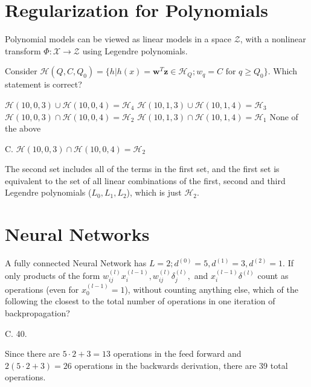 \documentclass[answers]{exam}
\begin{document}
\section*{Regularization for Polynomials}

Polynomial models can be viewed as linear models in a space $\mathcal{Z}$, 
with a nonlinear transform $\Phi : \mathcal{X} \to \mathcal{Z}$ using 
Legendre polynomials.

\begin{questions}
\setcounter{question}{6}
\question Consider $\mathcal{H}(Q, C, Q_0) = \{h | h(x) = \textbf{w}^T\textbf{z} 
\in \mathcal{H}_Q; w_q = C \text{ for } q \geq Q_0\}$. Which statement is correct?
\begin{choices}
\choice $\mathcal{H}(10, 0, 3) \cup \mathcal{H}(10, 0, 4) = \mathcal{H}_4$
\choice $\mathcal{H}(10, 1, 3) \cup \mathcal{H}(10, 1, 4) = \mathcal{H}_3$
\choice $\mathcal{H}(10, 0, 3) \cap \mathcal{H}(10, 0, 4) = \mathcal{H}_2$
\choice $\mathcal{H}(10, 1, 3) \cap \mathcal{H}(10, 1, 4) = \mathcal{H}_1$
\choice None of the above
\end{choices}

\begin{solution}
C. $\mathcal{H}(10, 0, 3) \cap \mathcal{H}(10, 0, 4) = \mathcal{H}_2$

The second set includes all of the terms in the first set, and the first
set is equivalent to the set of all linear combinations of the first, second
and third Legendre polynomials ($L_0, L_1, L_2$), which is just $\mathcal{H}_{2}$.
\end{solution}
\end{questions}

\section*{Neural Networks}

\begin{questions}
\setcounter{question}{7}
\question A fully connected Neural Network has $L = 2; d^{(0)} = 5, d^{(1)}
= 3, d^{(2)} = 1$. If only products of the form $w_{ij}^{(l)}x_{i}^{(l-1)}, 
w_{ij}^{(l)}\delta_{j}^{(l)},$ and $x_{i}^{(l-1)}\delta^{(l)}$ count as 
operations (even for $x_0^{(l-1)} = 1$), without counting anything else, 
which of the following the closest to the total number of operations in 
one iteration of backpropagation?
\begin{choices}
\end{choices}

\begin{solution}
C. 40.

Since there are $5 \cdot 2 + 3 = 13$ operations in the feed forward and
$2(5 \cdot 2 + 3) = 26$ operations in the backwards derivation, there are
39 total operations.
\end{solution}
\end{questions}
\end{document}
